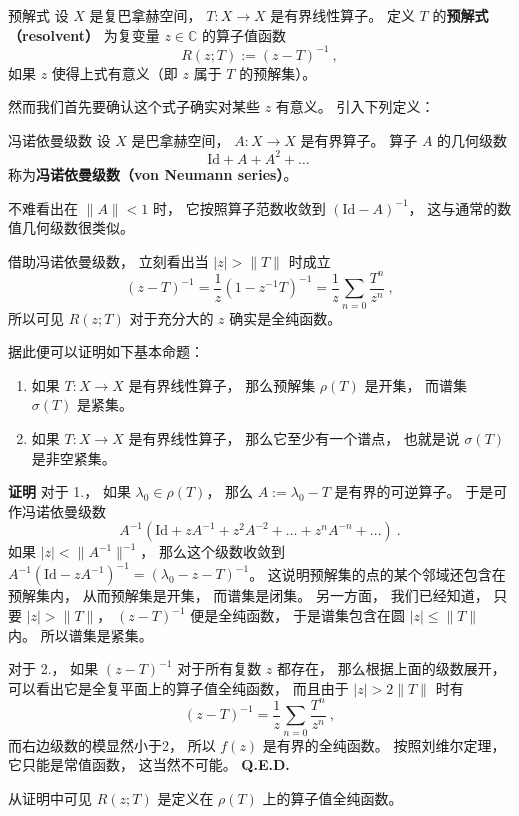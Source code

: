 

\begin{definition}{预解式}
设 $X$ 是复巴拿赫空间， $T:X\to X$ 是有界线性算子。 定义 $T$ 的\textbf{预解式（resolvent）} 为复变量 $z\in\mathbb{C}$ 的算子值函数
$$
R(z;T):=(z-T)^{-1}~,
$$
如果 $z$ 使得上式有意义（即 $z$ 属于 $T$ 的预解集）。
\end{definition}

然而我们首先要确认这个式子确实对某些 $z$ 有意义。 引入下列定义：

\begin{definition}{冯诺依曼级数}
设 $X$ 是巴拿赫空间， $A:X\to X$ 是有界算子。 算子 $A$ 的几何级数
$$
\text{Id}+A+A^2+\dots~
$$
称为\textbf{冯诺依曼级数（von Neumann series）}。
\end{definition}
不难看出在 $\|A\|<1$ 时， 它按照算子范数收敛到 $(\text{Id}-A)^{-1}$， 这与通常的数值几何级数很类似。 

借助冯诺依曼级数， 立刻看出当 $|z|>\|T\|$ 时成立
$$
(z-T)^{-1}
=\frac{1}{z}(1-z^{-1}T)^{-1}
=\frac{1}{z}\sum_{n=0}\frac{T^n}{z^n}~,
$$
所以可见 $R(z;T)$ 对于充分大的 $z$ 确实是全纯函数。

据此便可以证明如下基本命题：

\begin{theorem}{}
\begin{enumerate}
\item 如果 $T:X\to X$ 是有界线性算子， 那么预解集 $\rho(T)$ 是开集， 而谱集 $\sigma(T)$ 是紧集。
\item 如果 $T:X\to X$ 是有界线性算子， 那么它至少有一个谱点， 也就是说 $\sigma(T)$ 是非空紧集。
\end{enumerate}
\end{theorem}
\textbf{证明} 
对于 1.， 如果 $\lambda_0\in\rho(T)$， 那么 $A:=\lambda_0-T$ 是有界的可逆算子。 于是可作冯诺依曼级数
$$
A^{-1}(\text{Id}+zA^{-1}+z^2A^{-2}+\dots+z^nA^{-n}+\dots)~.
$$
如果 $|z|<\|A^{-1}\|^{-1}$， 那么这个级数收敛到 $A^{-1}(\text{Id}-zA^{-1})^{-1}=(\lambda_0-z-T)^{-1}$。 这说明预解集的点的某个邻域还包含在预解集内， 从而预解集是开集， 而谱集是闭集。 另一方面， 我们已经知道， 只要 $|z|>\|T\|$， $(z-T)^{-1}$ 便是全纯函数， 于是谱集包含在圆 $|z|\leq\|T\|$ 内。 所以谱集是紧集。

对于 2.， 如果 $(z-T)^{-1}$ 对于所有复数 $z$ 都存在， 那么根据上面的级数展开， 可以看出它是全复平面上的算子值全纯函数， 而且由于 $|z|>2\|T\|$ 时有
$$
(z-T)^{-1}=\frac{1}{z}\sum_{n=0}\frac{T^n}{z^n}~,
$$
而右边级数的模显然小于2， 所以 $f(z)$ 是有界的全纯函数。 按照刘维尔定理， 它只能是常值函数， 这当然不可能。 \textbf{Q.E.D.}

从证明中可见 $R(z;T)$ 是定义在 $\rho(T)$ 上的算子值全纯函数。
